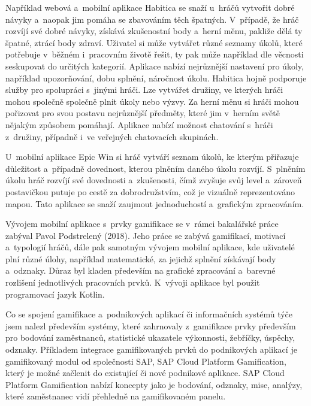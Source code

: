 \documentclass[12pt]{article}
\begin{document}
Například webová a~mobilní aplikace Habitica se snaží u~hráčů vytvořit dobré návyky
a~naopak jim pomáha se zbavováním těch špatných.
V~případě, že hráč rozvíjí své dobré návyky,
získává zkušenostní body a~herní měnu, 
pakliže dělá ty špatné, ztrácí body zdraví. 
Uživatel si může vytvářet různé seznamy úkolů,
které potřebuje v~běžném i~pracovním životě řešit,
ty pak může například dle věcnosti seskupovat do určitých kategorií.
Aplikace nabízí nejrůznější nastavení pro úkoly, například upozorňování, dobu splnění, náročnost úkolu.
Habitica hojně podporuje služby pro spolupráci s~jinými hráči. Lze vytvářet družiny,
ve kterých hráči mohou společně společně plnit úkoly nebo výzvy.
Za herní měnu si hráči mohou pořizovat pro svou postavu nejrůznější předměty, 
které jim v~herním světě nějakým způsobem pomáhají. 
Aplikace nabízí možnost chatování s~hráči z~družiny, případně i~ve veřejných chatovacích skupinách.  

\par

U~mobilní aplikace Epic Win si hráč vytváří seznam úkolů,
ke kterým přiřazuje důležitost a~případně dovednost,
kterou plněním daného úkolu rozvíjí. S~plněním úkolu hráč rozvíjí své dovednosti a~zkušenosti, čímž zvyšuje svůj level a~zároveň postavičkou putuje po cestě za dobrodružstvím, 
což je vizuálně reprezentováno mapou. Tato aplikace se snaží zaujmout jednoduchostí a~grafickým zpracováním.

\par

Vývojem mobilní aplikace s~prvky gamifikace se v~rámci bakalářské práce zabýval Pavol Podstrelený (2018). 
Jeho práce se zabývá gamifikací, motivací a~typologií hráčů, dále pak samotným vývojem mobilní aplikace, 
kde uživatelé plní různé úlohy, například matematické, za jejichž splnění získávají body a~odznaky.
Důraz byl kladen především na grafické zpracování a~barevné rozlišení jednotlivých pracovních prvků.
K~vývoji aplikace byl použit programovací jazyk Kotlin.

\par

Co se spojení gamifikace a~podnikových aplikací či informačních systémů týče jsem nalezl především systémy,
které zahrnovaly z~gamifikace prvky především pro bodování zaměstnanců, statistické ukazatele výkonnosti, žebříčky, úspěchy, odznaky.
Příkladem integrace gamifikovaných prvků do podnikových aplikací je gamifikovaný modul od společnosti SAP, SAP Cloud Platform Gamification,
který je možné začlenit do existující či nové podnikové aplikace. 
SAP Cloud Platform Gamification nabízí koncepty jako je bodování, odznaky, mise, analýzy, které zaměstnanec vidí přehledně na gamifikovaném panelu.
\end{document}
